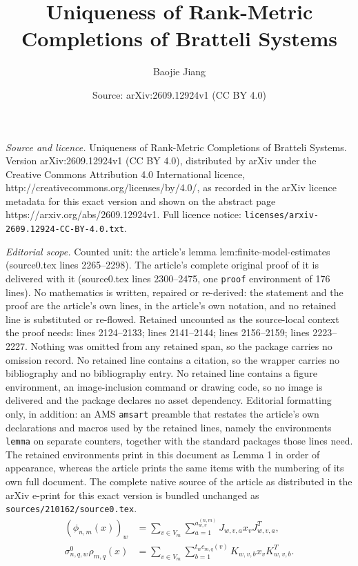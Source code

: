\documentclass[10pt,a4paper]{amsart}
\title{Uniqueness of Rank-Metric Completions of Bratteli Systems}
\author{Baojie Jiang}
\date{Source: arXiv:2609.12924v1 (CC BY 4.0)}
\begin{document}
\maketitle

\noindent\emph{Source and licence.} Uniqueness of Rank-Metric Completions of Bratteli Systems. Version arXiv:2609.12924v1 (CC BY 4.0), distributed by arXiv under the Creative Commons Attribution 4.0 International licence, http://creativecommons.org/licenses/by/4.0/, as recorded in the arXiv licence metadata for this exact version and shown on the abstract page https://arxiv.org/abs/2609.12924v1. Full licence notice: \texttt{licenses/arxiv-2609.12924-CC-BY-4.0.txt}.\par\smallskip

\noindent\textit{Editorial scope.} Counted unit: the article's lemma lem:finite-model-estimates (source0.tex lines 2265--2298). The article's complete original proof of it is delivered with it (source0.tex lines 2300--2475, one \texttt{proof} environment of 176 lines). No mathematics is written, repaired or re-derived: the statement and the proof are the article's own lines, in the article's own notation, and no retained line is substituted or re-flowed.  Retained uncounted as the source-local context the proof needs: lines 2124--2133; lines 2141--2144; lines 2156--2159; lines 2223--2227.  Nothing was omitted from any retained span, so the package carries no omission record.  No retained line contains a citation, so the wrapper carries no bibliography and no bibliography entry.  No retained line contains a figure environment, an image-inclusion command or drawing code, so no image is delivered and the package declares no asset dependency.  Editorial formatting only, in addition: an AMS \texttt{amsart} preamble that restates the article's own declarations and macros used by the retained lines, namely the environments \texttt{lemma} on separate counters, together with the standard packages those lines need.  The retained environments print in this document as Lemma 1 in order of appearance, whereas the article prints the same items with the numbering of its own full document.  The complete native source of the article as distributed in the arXiv e-print for this exact version is bundled unchanged as \texttt{sources/210162/source0.tex}.
\begin{equation}\label{eq:alignment-coordinate-copies}
 \begin{aligned}
 (\phi_{n,m}(x))_w
 &=\sum_{v\in V_m}\sum_{a=1}^{a_{w,v}^{(n,m)}}
       J_{w,v,a}x_vJ_{w,v,a}^{T},\\
 \sigma_{n,q,w}^0\rho_{m,q}(x)
 &=\sum_{v\in V_m}\sum_{b=1}^{t_wc_{m,q}(v)}
       K_{w,v,b}x_vK_{w,v,b}^{T}.
 \end{aligned}
\end{equation}
\end{document}
